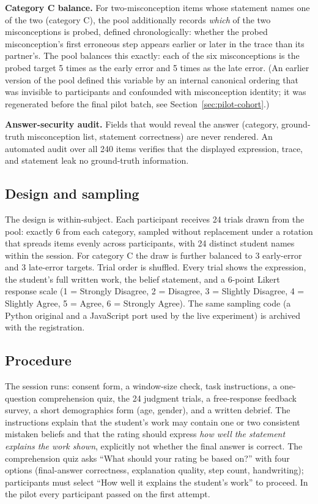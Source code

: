 \documentclass[11pt]{article}
\begin{document}
\smallskip
\textbf{Category C balance.} For two-misconception items whose statement names one of the two
(category C), the pool additionally records \emph{which} of the two misconceptions is probed,
defined chronologically: whether the probed misconception's first erroneous step appears
earlier or later in the trace than its partner's. The pool balances this exactly: each of the
six misconceptions is the probed target 5 times as the early error and 5 times as the late
error. (An earlier version of the pool defined this variable by an internal canonical ordering
that was invisible to participants and confounded with misconception identity; it was
regenerated before the final pilot batch, see Section~\ref{sec:pilot-cohort}.)

\smallskip
\textbf{Answer-security audit.} Fields that would reveal the answer (category, ground-truth
misconception list, statement correctness) are never rendered. An automated audit over all 240
items verifies that the displayed expression, trace, and statement leak no ground-truth
information.

\subsection{Design and sampling}\label{sec:design}

The design is within-subject. Each participant receives 24 trials drawn from the pool: exactly
6 from each category, sampled without replacement under a rotation that spreads items evenly
across participants, with 24 distinct student names within the session. For category C the
draw is further balanced to 3 early-error and 3 late-error targets. Trial order is shuffled.
Every trial shows the expression, the student's full written work, the belief statement, and a
6-point Likert response scale (1 = Strongly Disagree, 2 = Disagree, 3 = Slightly Disagree,
4 = Slightly Agree, 5 = Agree, 6 = Strongly Agree). The same sampling code (a Python original
and a JavaScript port used by the live experiment) is archived with the registration.

\subsection{Procedure}\label{sec:procedure}

The session runs: consent form, a window-size check, task instructions, a one-question
comprehension quiz, the 24 judgment trials, a free-response feedback survey, a short
demographics form (age, gender), and a written debrief. The instructions explain that the
student's work may contain one or two consistent mistaken beliefs and that the rating should
express \emph{how well the statement explains the work shown}, explicitly not whether the
final answer is correct. The comprehension quiz asks ``What should your rating be based on?''
with four options (final-answer correctness, explanation quality, step count, handwriting);
participants must select ``How well it explains the student's work'' to proceed. In the pilot
every participant passed on the first attempt.
\end{document}
